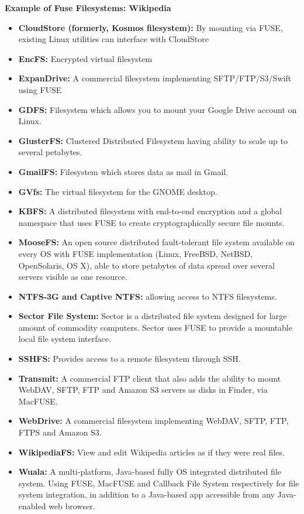 \textbf{Example of Fuse Filesystems: Wikipedia} 
\begin{itemize}

\item \textbf{CloudStore (formerly, Kosmos filesystem):} By mounting via FUSE, existing Linux utilities can interface with CloudStore
\item \textbf{EncFS:} Encrypted virtual filesystem
\item \textbf{ExpanDrive:} A commercial filesystem implementing SFTP/FTP/S3/Swift using FUSE
\item \textbf{GDFS:} Filesystem which allows you to mount your Google Drive account on Linux.

\item \textbf{GlusterFS:} Clustered Distributed Filesystem having ability to scale up to several petabytes.
\item \textbf{GmailFS:} Filesystem which stores data as mail in Gmail.
\item \textbf{GVfs:} The virtual filesystem for the GNOME desktop.
\item \textbf{KBFS:} A distributed filesystem with end-to-end encryption and a global namespace that uses FUSE to create cryptographically secure file mounts.
\item \textbf{MooseFS:} An open source distributed fault-tolerant file system available on every OS with FUSE implementation (Linux, FreeBSD, NetBSD, OpenSolaris, OS X), able to store petabytes of data spread over several servers visible as one resource.
\item \textbf{NTFS-3G and Captive NTFS:} allowing access to NTFS filesystems.
\item \textbf{Sector File System:} Sector is a distributed file system designed for large amount of commodity computers. Sector uses FUSE to provide a mountable local file system interface.
\item \textbf{SSHFS:} Provides access to a remote filesystem through SSH.
\item \textbf{Transmit:} A commercial FTP client that also adds the ability to mount WebDAV, SFTP, FTP and Amazon S3 servers as disks in Finder, via MacFUSE.
\item \textbf{WebDrive:} A commercial filesystem implementing WebDAV, SFTP, FTP, FTPS and Amazon S3.
\item \textbf{WikipediaFS:} View and edit Wikipedia articles as if they were real files.
\item \textbf{Wuala:} A multi-platform, Java-based fully OS integrated distributed file system. Using FUSE, MacFUSE and Callback File System respectively for file system integration, in addition to a Java-based app accessible from any Java-enabled web browser.
\end{itemize}

